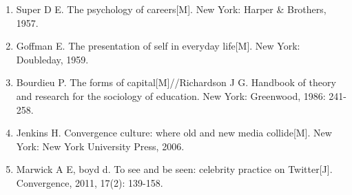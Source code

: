 \begin{enumerate}
  \item Super D E. The psychology of careers[M]. New York: Harper \& Brothers, 1957.
  \item Goffman E. The presentation of self in everyday life[M]. New York: Doubleday, 1959.
  \item Bourdieu P. The forms of capital[M]//Richardson J G. Handbook of theory and research for the sociology of education. New York: Greenwood, 1986: 241-258.
  \item Jenkins H. Convergence culture: where old and new media collide[M]. New York: New York University Press, 2006.
  \item Marwick A E, boyd d. To see and be seen: celebrity practice on Twitter[J]. Convergence, 2011, 17(2): 139-158.
\end{enumerate}

